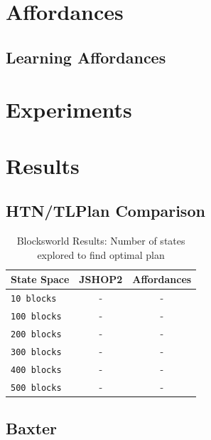 \documentclass[conference]{IEEEtran}
\begin{document}
\section{Affordances}
\label{sec:affordances}
\subsection{Learning Affordances}

\section{Experiments}
\label{sec:experiments}

\section{Results}
\label{sec:results}

\subsection{HTN/TLPlan Comparison}

\begin{table}[H]
\centering
\begin{tabular}{ l || c c }
  State Space 			& JSHOP2 	& Affordances \\ \hline
  \texttt{10 blocks}  		& 	-		&	-	\\
  \texttt{100 blocks}  		& 	-		&	-	\\
  \texttt{200 blocks}  		& 	-		&	-	\\
  \texttt{300 blocks}  		& 	-		&	-	\\
  \texttt{400 blocks}  		& 	-		&	-	\\
  \texttt{500 blocks}  		& 	-		&	-	\\
\end{tabular}
\caption{Blocksworld Results: Number of states explored to find optimal plan}
\label{table:minecraft_results_bellman}
\end{table}

\subsection{Baxter}
\end{document}
